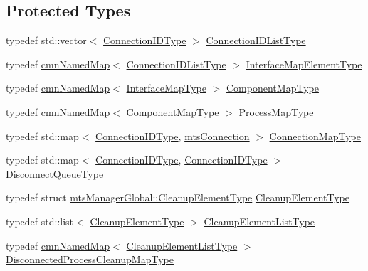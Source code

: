 \subsection*{Protected Types}
\begin{DoxyCompactItemize}
\item 
typedef std\+::vector$<$ \hyperlink{mts_forward_declarations_8h_ad3543bb11742e1766374ec96016d6547}{Connection\+I\+D\+Type} $>$ \hyperlink{classmts_manager_global_a01bcfffc97f320cdd87425bd4bd5bbad}{Connection\+I\+D\+List\+Type}
\item 
typedef \hyperlink{classcmn_named_map}{cmn\+Named\+Map}$<$ \hyperlink{classmts_manager_global_a01bcfffc97f320cdd87425bd4bd5bbad}{Connection\+I\+D\+List\+Type} $>$ \hyperlink{classmts_manager_global_a3449158e2432ced5a21d4853a2ca59b6}{Interface\+Map\+Element\+Type}
\item 
typedef \hyperlink{classcmn_named_map}{cmn\+Named\+Map}$<$ \hyperlink{structmts_manager_global_1_1_interface_map_type}{Interface\+Map\+Type} $>$ \hyperlink{classmts_manager_global_ab954b59b5453e8c20301f3772bb1484f}{Component\+Map\+Type}
\item 
typedef \hyperlink{classcmn_named_map}{cmn\+Named\+Map}$<$ \hyperlink{classmts_manager_global_ab954b59b5453e8c20301f3772bb1484f}{Component\+Map\+Type} $>$ \hyperlink{classmts_manager_global_ab0257cb91cc9d4c59cf85706f65da9f1}{Process\+Map\+Type}
\item 
typedef std\+::map$<$ \hyperlink{mts_forward_declarations_8h_ad3543bb11742e1766374ec96016d6547}{Connection\+I\+D\+Type}, \hyperlink{classmts_connection}{mts\+Connection} $>$ \hyperlink{classmts_manager_global_abee7afe21ca1987b873dbfdc3ac2fbfb}{Connection\+Map\+Type}
\item 
typedef std\+::map$<$ \hyperlink{mts_forward_declarations_8h_ad3543bb11742e1766374ec96016d6547}{Connection\+I\+D\+Type}, \hyperlink{mts_forward_declarations_8h_ad3543bb11742e1766374ec96016d6547}{Connection\+I\+D\+Type} $>$ \hyperlink{classmts_manager_global_a2513c197a42becaff9d23272f4a7be4b}{Disconnect\+Queue\+Type}
\item 
typedef struct \hyperlink{structmts_manager_global_1_1_cleanup_element_type}{mts\+Manager\+Global\+::\+Cleanup\+Element\+Type} \hyperlink{classmts_manager_global_a52d8af643eef029ad83e5e430604261a}{Cleanup\+Element\+Type}
\item 
typedef std\+::list$<$ \hyperlink{structmts_manager_global_1_1_cleanup_element_type}{Cleanup\+Element\+Type} $>$ \hyperlink{classmts_manager_global_a2e81b6e4dd89cef56e621cac95944bfd}{Cleanup\+Element\+List\+Type}
\item 
typedef \hyperlink{classcmn_named_map}{cmn\+Named\+Map}$<$ \hyperlink{classmts_manager_global_a2e81b6e4dd89cef56e621cac95944bfd}{Cleanup\+Element\+List\+Type} $>$ \hyperlink{classmts_manager_global_a9df2055466c1e6a041ae3abc266fe507}{Disconnected\+Process\+Cleanup\+Map\+Type}
\end{DoxyCompactItemize}
